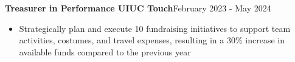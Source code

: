 \documentclass[a4paper]{article}
\begin{document}
\textbf{Treasurer in Performance UIUC Touch}\hfill February 2023 - May 2024\\
\begin{itemize}[nolistsep]
    \item Strategically plan and execute 10 fundraising 
    initiatives to support team activities, costumes,
    and travel expenses, resulting in a 30\% 
    increase in available funds compared to the previous year
\end{itemize}




\end{document}
